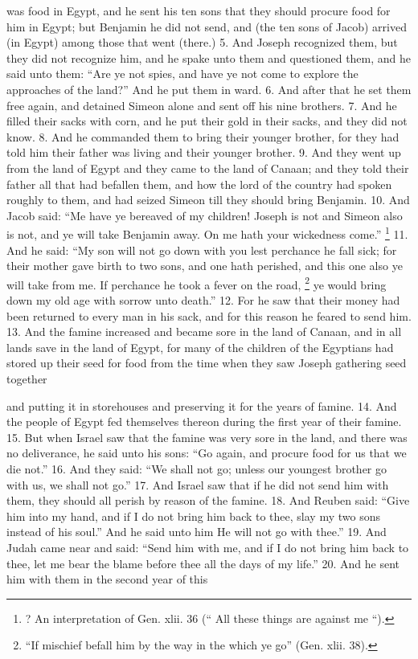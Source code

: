 was food in Egypt, and he sent his ten sons that they should procure food for him in Egypt; but Benjamin he did not send, and (the ten sons of Jacob) arrived (in Egypt) among those that went (there.) 5. And Joseph recognized them, but they did not recognize him, and he spake unto them and questioned them, and he said unto them: ``Are ye not spies, and have ye not come to explore the approaches of the land?'' And he put them in ward. 6. And after that he set them free again, and detained Simeon alone and sent off his nine brothers. 7. And he filled their sacks with corn, and he put their gold in their sacks, and they did not know. 8. And he commanded them to bring their younger brother, for they had told him their father was living and their younger brother. 9. And they went up from the land of Egypt and they came to the land of Canaan; and they told their father all that had befallen them, and how the lord of the country had spoken roughly to them, and had seized Simeon till they should bring Benjamin. 10. And Jacob said: ``Me have ye bereaved of my children! Joseph is not and Simeon also is not, and ye will take Benjamin away. On me hath your wickedness come.'' \footnote{? An interpretation of Gen. xlii. 36 (`` All these things are against me ``).} 11. And he said: ``My son will not go down with you lest perchance he fall sick; for their mother gave birth to two sons, and one hath perished, and this one also ye will take from me. If perchance he took a fever on the road, \footnote{``If mischief befall him by the way in the which ye go'' (Gen. xlii. 38).} ye would bring down my old age with sorrow unto death.'' 12. For he saw that their money had been returned to every man in his sack, and for this reason he feared to send him. 13. And the famine increased and became sore in the land of Canaan, and in all lands save in the land of Egypt, for many of the children of the Egyptians had stored up their seed for food from the time when they saw Joseph gathering seed together

and putting it in storehouses and preserving it for the years of famine. 14. And the people of Egypt fed themselves thereon during the first year of their famine. 15. But when Israel saw that the famine was very sore in the land, and there was no deliverance, he said unto his sons: ``Go again, and procure food for us that we die not.'' 16. And they said: ``We shall not go; unless our youngest brother go with us, we shall not go.'' 17. And Israel saw that if he did not send him with them, they should all perish by reason of the famine. 18. And Reuben said: ``Give him into my hand, and if I do not bring him back to thee, slay my two sons instead of his soul.'' And he said unto him He will not go with thee.'' 19. And Judah came near and said: ``Send him with me, and if I do not bring him back to thee, let me bear the blame before thee all the days of my life.'' 20. And he sent him with them in the second year of this

